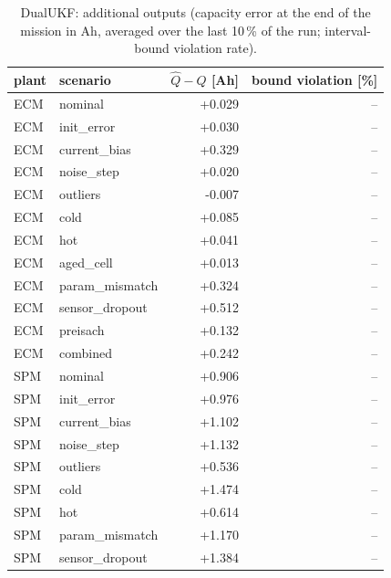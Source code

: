 \begin{table}[H]\centering\small\caption{DualUKF: additional outputs (capacity error at the end of the mission in Ah, averaged over the last 10\,\% of the run; interval-bound violation rate).}\label{tab:cellx_DualUKF}
\begin{tabular}{llrr}\toprule plant & scenario & $\hat Q - Q$ [Ah] & bound violation [\%] \\ \midrule
ECM & nominal & +0.029 & -- \\
ECM & init\_error & +0.030 & -- \\
ECM & current\_bias & +0.329 & -- \\
ECM & noise\_step & +0.020 & -- \\
ECM & outliers & -0.007 & -- \\
ECM & cold & +0.085 & -- \\
ECM & hot & +0.041 & -- \\
ECM & aged\_cell & +0.013 & -- \\
ECM & param\_mismatch & +0.324 & -- \\
ECM & sensor\_dropout & +0.512 & -- \\
ECM & preisach & +0.132 & -- \\
ECM & combined & +0.242 & -- \\
SPM & nominal & +0.906 & -- \\
SPM & init\_error & +0.976 & -- \\
SPM & current\_bias & +1.102 & -- \\
SPM & noise\_step & +1.132 & -- \\
SPM & outliers & +0.536 & -- \\
SPM & cold & +1.474 & -- \\
SPM & hot & +0.614 & -- \\
SPM & param\_mismatch & +1.170 & -- \\
SPM & sensor\_dropout & +1.384 & -- \\
\bottomrule\end{tabular}\end{table}
